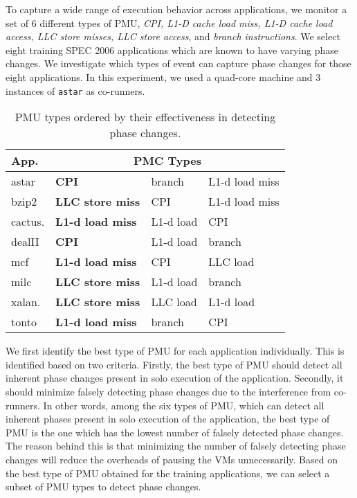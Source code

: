 \documentclass{sig-alternate}
\begin{document}
To capture a wide range of execution behavior across applications, we monitor a set of 6 different types of PMU, \textit{CPI, L1-D cache load miss, L1-D cache load access, LLC store misses, LLC store access}, and \textit{branch instructions}. We select eight training SPEC 2006 applications which are known to have varying phase changes. We investigate which types of event can capture phase changes for those eight applications. In this experiment, we used a quad-core machine and 3 instances of \texttt{astar} as co-runners.
\begin{table}[bt!]
\begin{footnotesize}
\begin{tabular}{|l|lll|}
\hline
\multicolumn{1}{|l|}{App.} & \multicolumn{3}{|c|}{PMC Types} \\ \hline
astar & \textbf{CPI} & branch & L1-d load miss  \\
bzip2 & \textbf{LLC store miss} & CPI & L1-d load miss  \\
cactus.& \textbf{L1-d load miss} & L1-d load & CPI  \\
dealII & \textbf{CPI} & L1-d load & branch  \\
mcf & \textbf{L1-d load miss} & CPI & LLC load \\
milc & \textbf{LLC store miss} & L1-d load & branch\\
xalan. & \textbf{LLC store miss} & LLC load & L1-d load \\
tonto & \textbf{L1-d load miss} & branch & CPI  \\ \hline
\end{tabular}
\caption{PMU types ordered by their effectiveness in detecting phase changes. }
\vspace{-0.2in}
\label{table:pmctype}
\end{footnotesize}
\end{table}

We first identify the best type of PMU for each application individually. This is identified based on two criteria. Firstly, the best type of PMU should detect all inherent phase changes present in solo execution of the application. Secondly, it should minimize falsely detecting phase changes due to the interference from co-runners. In other words, among the six types of PMU, which can detect all inherent phases present in solo execution of the application, the best type of PMU is the one which has the lowest number of falsely detected phase changes. The reason behind this is that minimizing the number of falsely detecting phase changes will reduce the overheads of pausing the VMs unnecessarily. Based on the best type of PMU obtained for the training applications, we can select a subset of PMU types to detect phase changes. 
\end{document}
